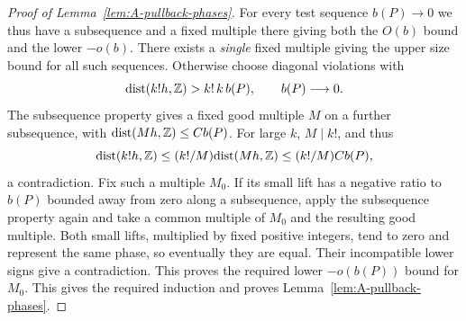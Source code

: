 \begin{proof}[Proof of Lemma~\ref{lem:A-pullback-phases}]
For every test sequence \(b(P)\to0\) we thus have a subsequence and a fixed multiple there giving both the \(O(b)\) bound and the lower \(-o(b)\).
There exists a \emph{single} fixed multiple giving the upper size bound
for all such sequences.  Otherwise choose diagonal violations with
\[
 {\rm dist}(k!h,\mathbb Z)>k!\,k\,b(P),\qquad b(P)\longrightarrow0.
\]
The subsequence property gives a fixed good multiple \(M\) on a
further subsequence, with
\({\rm dist}(Mh,\mathbb Z)\le Cb(P)\).
For large \(k\), \(M\mid k!\), and thus
\[
 {\rm dist}(k!h,\mathbb Z)
 \le (k!/M){\rm dist}(Mh,\mathbb Z)
 \le (k!/M)C b(P),
\]
a contradiction.
Fix such a multiple \(M_0\).  If its small lift has a negative
ratio to \(b(P)\) bounded away from zero along a subsequence, apply
the subsequence property again and take a common multiple of \(M_0\)
and the resulting good multiple.  Both small lifts, multiplied by
fixed positive integers, tend to zero and represent the same phase,
so eventually they are equal.  Their incompatible lower signs
give a contradiction.  This proves the required lower
\(-o(b(P))\) bound for \(M_0\).
This gives the required induction and proves Lemma~\ref{lem:A-pullback-phases}.

\end{proof}

